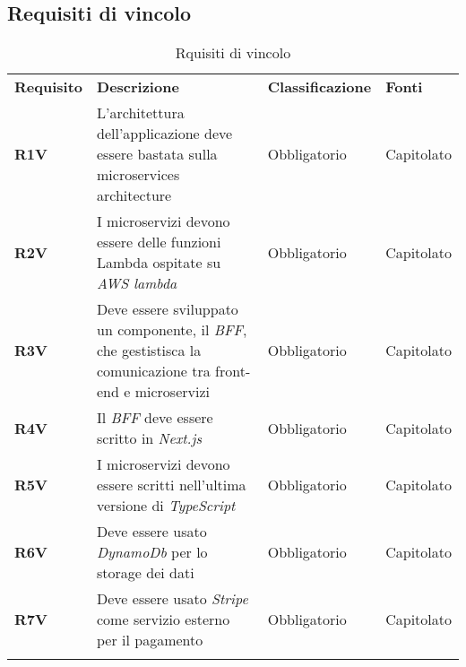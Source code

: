 \newpage
\subsection{Requisiti di vincolo}
\begin{center}
    \centering
    \renewcommand{\arraystretch}{1.8}
    \label{tab:RequisitiVincolo}
    \begin{longtable}[!h]{p{50px} p{200px} p{100px} p{50px}}
        \rowcolor{logo!70} \textbf{Requisito} & \textbf{Descrizione}                                                                                                 & \textbf{Classificazione} & \textbf{Fonti} \\
        \textbf{R1V}                          & L'architettura dell'applicazione deve essere bastata sulla microservices architecture                                & Obbligatorio             & Capitolato     \\
        \textbf{R2V}                          & I microservizi devono essere delle funzioni \newline Lambda ospitate su \textit{AWS lambda}                          & Obbligatorio             & Capitolato     \\
        \textbf{R3V}                          & Deve essere sviluppato un componente, il \textit{BFF}, che gestistisca la comunicazione tra front-end e microservizi & Obbligatorio             & Capitolato     \\
        \textbf{R4V}                          & Il \textit{BFF} deve essere scritto in \textit{Next.js}                                                              & Obbligatorio             & Capitolato     \\
        \textbf{R5V}                          & I microservizi devono essere scritti nell'ultima versione di \textit{TypeScript}                                     & Obbligatorio             & Capitolato     \\
        \textbf{R6V}                          & Deve essere usato \textit{DynamoDb} per lo storage dei dati                                                          & Obbligatorio             & Capitolato     \\
        \textbf{R7V}                          & Deve essere usato \textit{Stripe} come servizio esterno per il pagamento                                             & Obbligatorio             & Capitolato     \\
        \rowcolor{white}\caption{Rquisiti di vincolo}
    \end{longtable}
\end{center}

